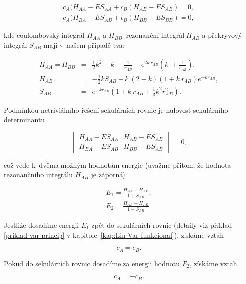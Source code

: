 \begin{eqnarray}
c_A (H_{AA} - E S_{AA} + c_B (H_{AB} - E S_{AB}) = 0, \nonumber \\
c_A (H_{BA} - E S_{AB} + c_B (H_{BB} - E S_{BB}) = 0,
\label{rov:ElStrukt-6}
\end{eqnarray}

\noindent kde coulombovský integrál $H_{AA}$ a $H_{BB}$, rezonanční integrál $H_{AB}$ a překryvový integrál $S_{AB}$ mají v~našem případě tvar

\begin{eqnarray}
H_{AA} = H_{BB} &=& \frac{1}{2} k^2 - k~- \frac{1}{r_{AB}} - e^{2 k~r_{AB}} \left( k~+ \frac{1}{r_{AB}} \right), \nonumber \\
H_{AB} &=& -\frac{1}{2}k S_{AB} - k~(2-k) (1+ k~r_{AB}) e^{-k r_{AB}}, \nonumber \\
S_{AB} &=& e^{-k r_{AB}} \left(1 + k~r_{AB} + \frac{1}{3}k^2 r_{AB}^2 \right).
\label{rov:ElStrukt-7}
\end{eqnarray}

Podmínkou netriviálního řešení sekulárních rovnic je nulovost sekulárního determinantu


\begin{equation}
\begin{vmatrix}
H_{AA} - E S_{AA} & H_{AB} - E S_{AB}\\
H_{BA} - E S_{AB} & H_{BB} - E S_{AB}
\end{vmatrix}
=0,
\label{rov:ElStrukt-8}
\end{equation}

\noindent což vede k~dvěma možným hodnotám energie (uvažme přitom, že hodnota rezonančního integrálu $H_{AB}$ je záporná)

\begin{eqnarray}
E_1 = \frac{H_{AA} + H_{AB}}{1+S_{AB}}, \nonumber \\
E_2 = \frac{H_{AA} - H_{AB}}{1-S_{AB}}.
\label{rov:ElStrukt-9}
\end{eqnarray}

Jestliže dosadíme energii $E_1$ zpět do sekulárních rovnic (detaily viz příklad \ref{priklad var princip} v kapitole~\ref{kap:Lin Var funkcional}), získáme vztah 

\begin{equation}
c_A = c_B.
\label{rov:ElStrukt-10}
\end{equation}

Pokud do sekulárních rovnic  dosadíme za energii hodnotu $E_2$, získáme vztah

\begin{equation}
c_A = - c_B.
\label{rov:ElStrukt-11}
\end{equation}

